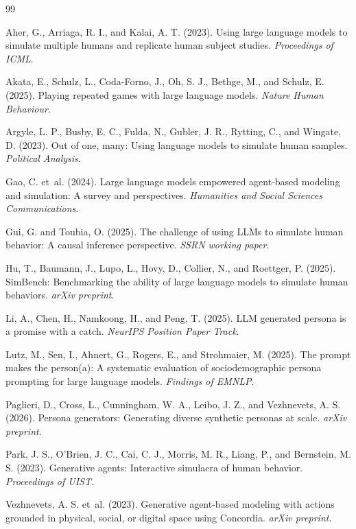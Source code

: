 \documentclass[11pt]{article}
\begin{document}
\begin{thebibliography}{99}

Aher, G., Arriaga, R. I., and Kalai, A. T. (2023).
Using large language models to simulate multiple humans and replicate human subject studies.
\textit{Proceedings of ICML}.

Akata, E., Schulz, L., Coda-Forno, J., Oh, S. J., Bethge, M., and Schulz, E. (2025).
Playing repeated games with large language models.
\textit{Nature Human Behaviour}.

Argyle, L. P., Busby, E. C., Fulda, N., Gubler, J. R., Rytting, C., and Wingate, D. (2023).
Out of one, many: Using language models to simulate human samples.
\textit{Political Analysis}.

Gao, C. et~al. (2024).
Large language models empowered agent-based modeling and simulation: A survey and perspectives.
\textit{Humanities and Social Sciences Communications}.

Gui, G. and Toubia, O. (2025).
The challenge of using LLMs to simulate human behavior: A causal inference perspective.
\textit{SSRN working paper}.

Hu, T., Baumann, J., Lupo, L., Hovy, D., Collier, N., and Roettger, P. (2025).
SimBench: Benchmarking the ability of large language models to simulate human behaviors.
\textit{arXiv preprint}.

Li, A., Chen, H., Namkoong, H., and Peng, T. (2025).
LLM generated persona is a promise with a catch.
\textit{NeurIPS Position Paper Track}.

Lutz, M., Sen, I., Ahnert, G., Rogers, E., and Strohmaier, M. (2025).
The prompt makes the person(a): A systematic evaluation of sociodemographic persona prompting for large language models.
\textit{Findings of EMNLP}.

Paglieri, D., Cross, L., Cunningham, W. A., Leibo, J. Z., and Vezhnevets, A. S. (2026).
Persona generators: Generating diverse synthetic personas at scale.
\textit{arXiv preprint}.

Park, J. S., O'Brien, J. C., Cai, C. J., Morris, M. R., Liang, P., and Bernstein, M. S. (2023).
Generative agents: Interactive simulacra of human behavior.
\textit{Proceedings of UIST}.

Vezhnevets, A. S. et~al. (2023).
Generative agent-based modeling with actions grounded in physical, social, or digital space using Concordia.
\textit{arXiv preprint}.

\end{thebibliography}
\end{document}

